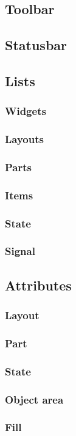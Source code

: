 \documentclass[titlepage,oneside,11pt]{book}
\begin{document}
\subsection{Toolbar}
\subsection{Statusbar}
\subsection{Lists}
\subsubsection{Widgets}
\subsubsection{Layouts}
\subsubsection{Parts}
\subsubsection{Items}
\subsubsection{State}
\subsubsection{Signal}
\subsection{Attributes}
\subsubsection{Layout}
\subsubsection{Part}
\subsubsection{State}
\subsubsection{Object area}
\subsubsection{Fill}
\end{document}
